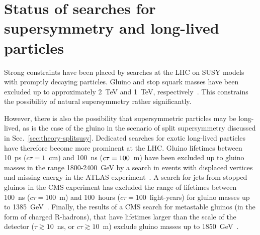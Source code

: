 \section{Status of searches for supersymmetry and long-lived particles}
\label{sec:theory-status}
Strong constraints have been placed by searches at the LHC on SUSY models with 
promptly decaying particles. Gluino and stop squark masses have been excluded 
up to approximately 2~TeV and 1~TeV, 
respectively~\cite{mt236,ra2b36,stop0L36,stop1L36,stop2L36}. 
This constrains the possibility of natural supersymmetry rather significantly.

However, there is also the possibility that supersymmetric particles may be 
long-lived, as is the case of the gluino in the scenario of split supersymmetry 
discussed in Sec.~\ref{sec:theory-splitsusy}. Dedicated searches for exotic 
long-lived particles have therefore become more prominent at the LHC. Gluino 
lifetimes between 10~ps ($c\tau=1$~cm) and 100~ns ($c\tau=100$~m) have been 
excluded up to gluino masses in the range 1800-2400~GeV by a search in events 
with displaced vertices and missing energy in the ATLAS 
experiment~\cite{dispvert-atlas}. A search for jets from stopped gluinos in the 
CMS experiment has excluded the range of lifetimes between 100~ns 
($c\tau=100$~m) and 100~hours ($c\tau=100$~light-years) for gluino masses up to 
1385~GeV~\cite{stoppedgluino-cms}. Finally, the results of a CMS search for 
metastable gluinos (in the form of charged R-hadrons), that have lifetimes 
larger than the scale of the detector ($\tau \gtrsim 10$~ns, or $c\tau \gtrsim 
10$~m) exclude gluino masses up to 1850~GeV~\cite{hscp-cms}.


